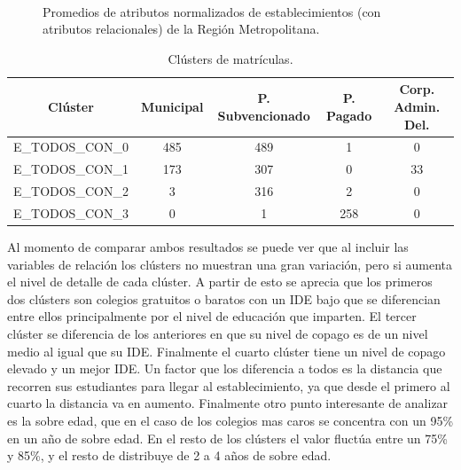 \begin{figure}[H]
 \caption{Promedios de atributos normalizados de establecimientos (con atributos relacionales) de la Región Metropolitana.}\
 \label{f:radar_estab_con}
\end{figure}

\begin{table}[H]
\centering
\caption{Clústers de matrículas.}
\label{tab:cl_dependencia_con}
\begin{tabular}{|c|c|c|c|c|}
\hline
\textbf{Clúster} & \textbf{Municipal} & \textbf{P. Subvencionado} & \textbf{P. Pagado} & \textbf{Corp. Admin. Del.}   \\ \hline
E\_TODOS\_CON\_0 & 485 & 489 & 1 & 0 \\ \hline
E\_TODOS\_CON\_1 & 173 & 307 & 0 & 33 \\ \hline
E\_TODOS\_CON\_2 & 3 & 316 & 2 & 0 \\ \hline
E\_TODOS\_CON\_3 & 0 & 1 & 258 & 0 \\ \hline
\end{tabular}
\end{table}

Al momento de comparar ambos resultados se puede ver que al incluir las variables de relación los clústers no muestran una gran variación, pero si aumenta el nivel de detalle de cada clúster. A partir de esto se aprecia que los primeros dos clústers son colegios gratuitos o baratos con un IDE bajo que se diferencian entre ellos principalmente por el nivel de educación que imparten. El tercer clúster se diferencia de los anteriores en que su nivel de copago es de un nivel medio al igual que su IDE. Finalmente el cuarto clúster tiene un nivel de copago elevado y un mejor IDE. Un factor que los diferencia a todos es la distancia que recorren sus estudiantes para llegar al establecimiento, ya que desde el primero al cuarto la distancia va en aumento. Finalmente otro punto interesante de analizar es la sobre edad, que en el caso de los colegios mas caros se concentra con un 95\% en un año de sobre edad. En el resto de los clústers el valor fluctúa entre un 75\% y 85\%, y el resto de distribuye de 2 a 4 años de sobre edad.

